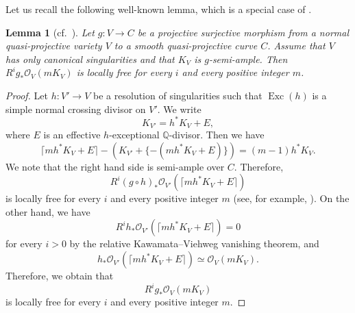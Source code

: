 \documentclass[12pt,twoside]{amsart}
\newtheorem{lem}[thm]{Lemma}
\theoremstyle{definition}
\begin{document}
Let us recall the following well-known lemma, which is 
a special case of \cite[Corollary 3]{nakayama1}. 

\begin{lem}[{cf.~\cite[Corollary 3]{nakayama1}}]\label{lem4.1} 
Let $g:V\to C$ be a projective surjective morphism 
from a normal quasi-projective 
variety $V$ to a smooth 
quasi-projective curve $C$. 
Assume that $V$ has only canonical singularities and 
that $K_V$ is $g$-semi-ample. 
Then $R^ig_*\mathcal O_V(mK_V)$ is locally free for every $i$ and 
every positive integer $m$. 
\end{lem}
\begin{proof}
Let $h:V'\to V$ be a resolution of singularities such that 
${{\operatorname{Exc}}}(h)$ is a simple normal crossing divisor on $V'$. 
We write 
$$
K_{V'}=h^*K_V+E,
$$ 
where $E$ is an effective $h$-exceptional 
$\mathbb Q$-divisor. 
Then we have 
$$
\lceil mh^*K_V+ E\rceil -(K_{V'}+\{-(mh^*K_V+E)\})=(m-1)h^*K_V. 
$$ 
We note that the right hand side is semi-ample over $C$. 
Therefore, $$R^i(g\circ h)_*\mathcal O_{V'}(\lceil mh^*K_V+ 
E\rceil)$$ is locally free for every $i$ and every positive integer 
$m$ (see, for example, \cite[Theorem 6.3 (i)]{fujino-fund}). 
On the other hand, we have 
$$
R^ih_*\mathcal O_{V'}(\lceil mh^*K_V+ E\rceil)=0 
$$ 
for every $i>0$ by the relative Kawamata--Viehweg vanishing theorem, 
and 
$$
h_*\mathcal O_{V'}(\lceil mh^*K_V+
E\rceil)\simeq \mathcal O_V(mK_V). 
$$
Therefore, we obtain that 
$$
R^ig_*\mathcal O_V(mK_V)$$ is locally free for every $i$ and 
every positive integer $m$. 
\end{proof}
\end{document}
